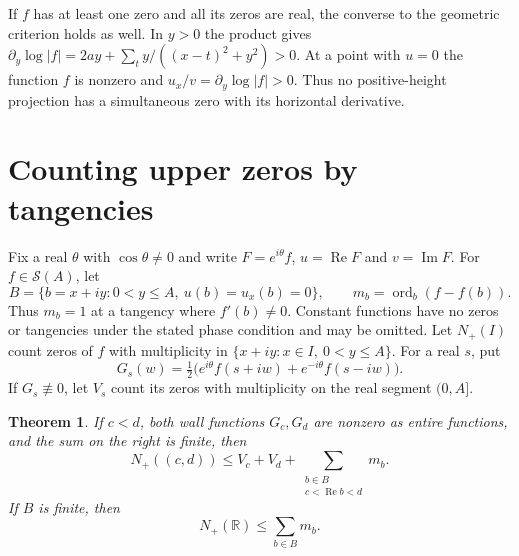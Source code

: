\documentclass[11pt,a4paper]{article}
\newtheorem{theorem}{Theorem}[section]
\numberwithin{equation}{section}
\renewcommand{\Re}{\operatorname{Re}}\renewcommand{\Im}{\operatorname{Im}}
\begin{document}
If $f$ has at least one zero and all its zeros are real, the converse
to the geometric criterion holds as well. In $y>0$ the product gives
$\partial_y\log|f|=2ay+\sum_t y/((x-t)^2+y^2)>0$. At a point with $u=0$
the function $f$ is nonzero and $u_x/v=\partial_y\log|f|>0$.
Thus no positive-height projection has a simultaneous zero with its
horizontal derivative.

\section{Counting upper zeros by tangencies}
\label{sec:counting}
Fix a real $\theta$ with $\cos\theta\ne0$ and write
$F=e^{i\theta}f$, $u=\Re F$ and $v=\Im F$. For $f\in\mathcal S(A)$,
let
\[
 B=\{b=x+iy:0<y\le A,\ u(b)=u_x(b)=0\},\qquad
 m_b=\operatorname{ord}_b(f-f(b)).
\]
Thus $m_b=1$ at a tangency where $f'(b)\ne0$. Constant functions have
no zeros or tangencies under the stated phase condition and may be
omitted. Let $N_+(I)$ count zeros of $f$ with multiplicity in
$\{x+iy:x\in I,\ 0<y\le A\}$. For a real $s$, put
\[
 G_s(w)=\tfrac12\big(e^{i\theta}f(s+iw)+e^{-i\theta}f(s-iw)\big).
\]
If $G_s\not\equiv0$, let $V_s$ count its zeros with multiplicity on
the real segment $(0,A]$.

\begin{theorem}\label{th:finite-tangencies}
If $c<d$, both wall functions $G_c,G_d$ are nonzero as entire
functions, and the sum on the right is finite, then
\begin{equation}\label{eq:bounded-window}
 N_+((c,d))\le V_c+V_d+
 \sum_{\substack{b\in B\\c<\Re b<d}}m_b .
\end{equation}
If $B$ is finite, then
\begin{equation}\label{eq:global-tangencies}
 N_+(\mathbb R)\le\sum_{b\in B}m_b .
\end{equation}
\end{theorem}
\end{document}
